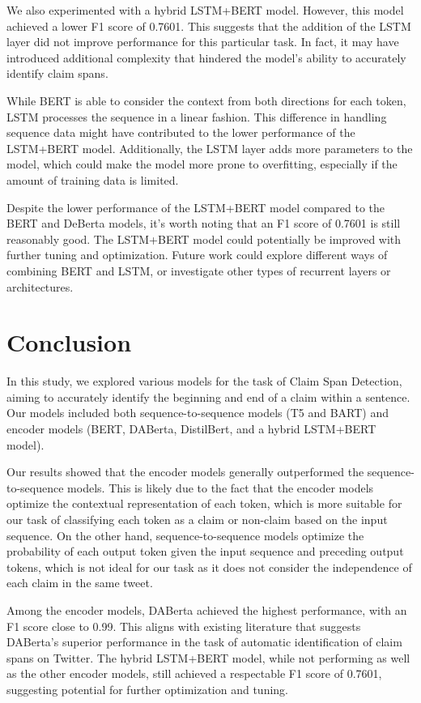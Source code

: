\documentclass[11pt]{article}
\begin{document}
We also experimented with a hybrid LSTM+BERT model. However, this model achieved a lower F1 score of 0.7601. This suggests that the addition of the LSTM layer did not improve performance for this particular task. In fact, it may have introduced additional complexity that hindered the model's ability to accurately identify claim spans.

While BERT is able to consider the context from both directions for each token, LSTM processes the sequence in a linear fashion. This difference in handling sequence data might have contributed to the lower performance of the LSTM+BERT model. Additionally, the LSTM layer adds more parameters to the model, which could make the model more prone to overfitting, especially if the amount of training data is limited.

Despite the lower performance of the LSTM+BERT model compared to the BERT and DeBerta models, it's worth noting that an F1 score of 0.7601 is still reasonably good. The LSTM+BERT model could potentially be improved with further tuning and optimization. Future work could explore different ways of combining BERT and LSTM, or investigate other types of recurrent layers or architectures.



\section{Conclusion}

In this study, we explored various models for the task of Claim Span Detection, aiming to accurately identify the beginning and end of a claim within a sentence. Our models included both sequence-to-sequence models (T5 and BART) and encoder models (BERT, DABerta, DistilBert, and a hybrid LSTM+BERT model).

Our results showed that the encoder models generally outperformed the sequence-to-sequence models. This is likely due to the fact that the encoder models optimize the contextual representation of each token, which is more suitable for our task of classifying each token as a claim or non-claim based on the input sequence. On the other hand, sequence-to-sequence models optimize the probability of each output token given the input sequence and preceding output tokens, which is not ideal for our task as it does not consider the independence of each claim in the same tweet.

Among the encoder models, DABerta achieved the highest performance, with an F1 score close to 0.99. This aligns with existing literature that suggests DABerta's superior performance in the task of automatic identification of claim spans on Twitter. The hybrid LSTM+BERT model, while not performing as well as the other encoder models, still achieved a respectable F1 score of 0.7601, suggesting potential for further optimization and tuning.
\end{document}
